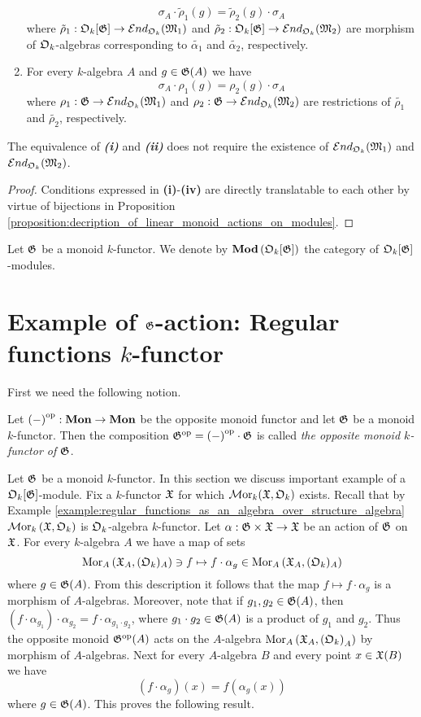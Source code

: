 \begin{proposition}
\begin{enumerate}[label=\emph{\textbf{(\roman*)}}, leftmargin=1.5em]
$$\sigma_A \cdot \tilde{\rho}_1(g) = \tilde{\rho}_2(g) \cdot \sigma_A$$
where $\tilde{\rho}_1:{\mathfrak O}_k[{\mathfrak G}] \rightarrow {\mathcal E} nd_{{\mathfrak O}_k}({\mathfrak M}_1)$ and $\tilde{\rho}_2:{\mathfrak O}_k[{\mathfrak G}] \rightarrow {\mathcal E} nd_{{\mathfrak O}_k}({\mathfrak M}_2)$ are morphism of ${\mathfrak O}_k$-algebras corresponding to $\tilde{\alpha_1}$ and $\tilde{\alpha_2}$, respectively.
\item For every $k$-algebra $A$ and $g\in {\mathfrak G}(A)$ we have
$$\sigma_A \cdot \rho_1(g) = \rho_2(g) \cdot \sigma_A$$
where $\rho_1:{\mathfrak G} \rightarrow {\mathcal E} nd_{{\mathfrak O}_k}({\mathfrak M}_1)$ and $\rho_2:{\mathfrak G} \rightarrow {\mathcal E} nd_{{\mathfrak O}_k}({\mathfrak M}_2)$ are restrictions of $\tilde{\rho_1}$ and $\tilde{\rho_2}$, respectively.
\end{enumerate}
The equivalence of \emph{\textbf{(i)}} and \emph{\textbf{(ii)}} does not require the existence of ${\mathcal E} nd_{{\mathfrak O}_k}({\mathfrak M}_1)$ and ${\mathcal E} nd_{{\mathfrak O}_k}({\mathfrak M}_2)$.
\end{proposition}
\begin{proof}
Conditions expressed in \textbf{(i)}-\textbf{(iv)} are directly translatable to each other by virtue of bijections in Proposition \ref{proposition:decription_of_linear_monoid_actions_on_modules}. 
\end{proof}
\noindent
Let ${\mathfrak G}$ be a monoid $k$-functor. We denote by $\mathbf{Mod}\left({\mathfrak O}_k[{\mathfrak G}]\right)$ the category of ${\mathfrak O}_k[{\mathfrak G}]$-modules.

\section{Example of ${\mathfrak G}$-action: Regular functions $k$-functor}
\noindent
First we need the following notion.

\begin{definition}
Let $\left(-\right)^{\mathrm{op}}:\mathbf{Mon} \rightarrow \mathbf{Mon}$ be the opposite monoid functor and let ${\mathfrak G}$ be a monoid $k$-functor. Then the composition ${\mathfrak G}^{\mathrm{op}} = \left(-\right)^{\mathrm{op}}\cdot {\mathfrak G}$ is called \textit{the opposite monoid $k$-functor of ${\mathfrak G}$}.
\end{definition}
\noindent
Let ${\mathfrak G}$ be a monoid $k$-functor. In this section we discuss important example of a ${\mathfrak O}_k[{\mathfrak G}]$-module. Fix a $k$-functor ${\mathfrak X}$ for which $\mathcal{M}\mathrm{or}_k({\mathfrak X},{\mathfrak O}_k)$ exists. Recall that by Example \ref{example:regular_functions_as_an_algebra_over_structure_algebra} $\mathcal{M}\mathrm{or}_k\left({\mathfrak X},{\mathfrak O}_k\right)$ is ${\mathfrak O}_k$-algebra $k$-functor. Let $\alpha:{\mathfrak G}\times {\mathfrak X}\rightarrow {\mathfrak X}$ be an action of ${\mathfrak G}$ on ${\mathfrak X}$. For every $k$-algebra $A$ we have a map of sets
$$\mathrm{Mor}_A\left({\mathfrak X}_A,({\mathfrak O}_k)_A\right) \ni f\mapsto f\cdot \alpha_{g}\in \mathrm{Mor}_A\left({\mathfrak X}_A,({\mathfrak O}_k)_A\right)$$
where $g\in {\mathfrak G}(A)$. From this description it follows that the map $f\mapsto f\cdot \alpha_{g}$ is a morphism of $A$-algebras. Moreover, note that if $g_1,g_2\in {\mathfrak G}(A)$, then $\left(f\cdot \alpha_{g_1}\right)\cdot \alpha_{g_2} = f\cdot \alpha_{g_1\cdot g_2}$, where $g_1\cdot g_2 \in {\mathfrak G}(A)$ is a product of $g_1$ and $g_2$. Thus the opposite monoid ${\mathfrak G}^{\mathrm{op}}(A)$ acts on the $A$-algebra $\mathrm{Mor}_A\left({\mathfrak X}_A,\left({\mathfrak O}_k\right)_A\right)$ by morphism of $A$-algebras. Next for every $A$-algebra $B$ and every point $x\in {\mathfrak X}(B)$ we have
$$(f\cdot \alpha_{g})(x) = f\left(\alpha_{g}(x)\right)$$
where $g\in {\mathfrak G}(A)$. This proves the following result.

